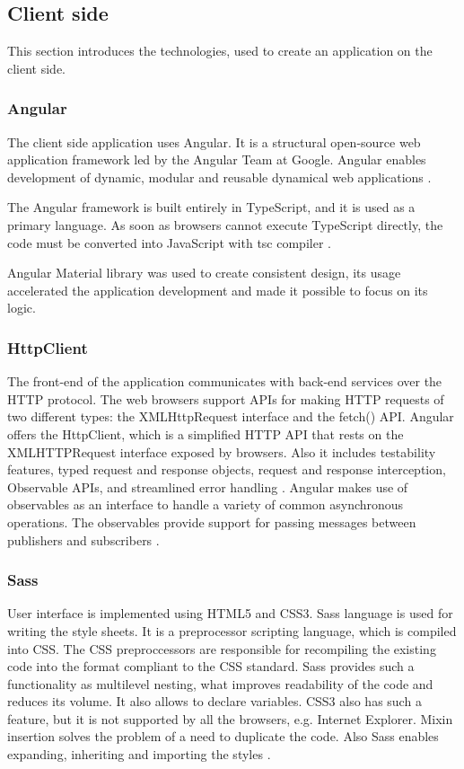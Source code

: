 \subsection{Client side}
This section introduces the technologies, used to create an application on the client side.

\subsubsection{Angular}
The client side application uses Angular. It is a structural open-source web application framework led by the Angular Team at Google. Angular enables development of dynamic, modular and reusable dynamical web applications \cite{angular_getting_started}.

The Angular framework is built entirely in TypeScript, and it is used as a primary language. As soon as browsers cannot execute TypeScript directly, the code must be converted into JavaScript with tsc compiler \cite[TypeScript Configuration]{angular}.

Angular Material library was used to create consistent design, its usage accelerated the application development and made it possible to focus on its logic.

\subsubsection{HttpClient}
The front-end of the application communicates with back-end services over the HTTP protocol. The web browsers support APIs for making HTTP requests of two different types: the XMLHttpRequest interface and the fetch() API. Angular offers the HttpClient, which is a simplified HTTP API that rests on the XMLHTTPRequest interface exposed by browsers. Also it includes testability features, typed request and response objects, request and response interception, Observable APIs, and streamlined error handling \cite[HttpClient]{angular}. Angular makes use of observables as an interface to handle a variety of common asynchronous operations. The observables provide support for passing messages between publishers and subscribers \cite[Observables \& RxJS]{angular}. 

\subsubsection{Sass}
User interface is implemented using HTML5 and CSS3. Sass language is used for writing the style sheets. It is a preprocessor scripting language, which is compiled into CSS. The CSS preproccessors are responsible for recompiling the existing code into the format compliant to the CSS standard. Sass provides such a functionality as multilevel nesting, what improves readability of the code and reduces its volume. It also allows to declare variables. CSS3 also has such a feature, but it is not supported by all the browsers, e.g. Internet Explorer. Mixin insertion solves the problem of a need to duplicate the code. Also Sass enables expanding, inheriting and importing the styles \cite{sass}.

